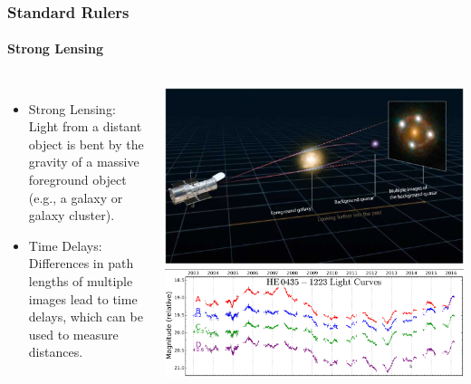\documentclass[aspectratio=169]{beamer}
\begin{document}
\begin{frame}
    \frametitle{Standard Rulers}
    \framesubtitle{Strong Lensing}
    \begin{columns}
        \begin{itemize}
            \item Strong Lensing: Light from a distant object is bent by the gravity of a massive foreground object (e.g., a galaxy or galaxy cluster). \hfill {}
            \item Time Delays: Differences in path lengths of multiple images lead to time delays, which can be used to measure distances. \hfill {}
        \end{itemize}
        \includegraphics[width=\textwidth]{figures/time_delay.jpg}
        \includegraphics[width=\textwidth]{figures/time_delay_curve.png}%
    \end{columns}
\end{frame}
\end{document}
